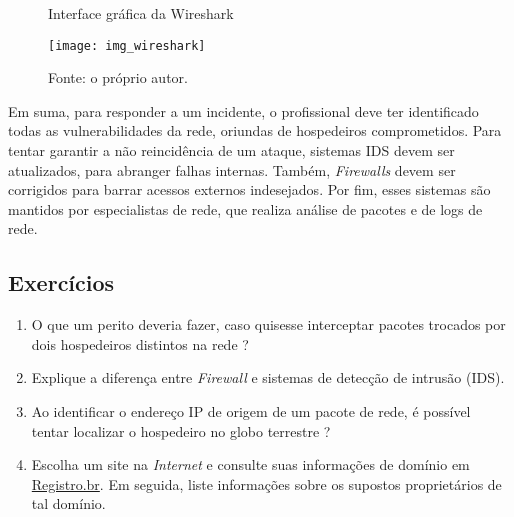     \begin{figure}[H]
    	\centering
    	\caption{Interface gráfica da Wireshark}
    	\texttt{[image: img\_wireshark]}
    	\caption*{Fonte: o próprio autor.}
    	\label{wireshark_ex}
    \end{figure}

    \hspace{1cm}
    Em suma, para responder a um incidente, o profissional deve ter identificado todas as vulnerabilidades da rede, oriundas de hospedeiros comprometidos. Para tentar garantir a não reincidência de um ataque, sistemas IDS devem ser atualizados, para abranger falhas internas. Também, \textit{Firewalls} devem ser corrigidos para barrar acessos externos indesejados. Por fim, esses sistemas são mantidos por especialistas de rede, que realiza análise de pacotes e de logs de rede.

    \subsection{Exercícios}
    
    \begin{example} \label{cap4_exercicios}
        \begin{enumerate}
            \item O que um perito deveria fazer, caso quisesse interceptar pacotes trocados por dois hospedeiros distintos na rede ?
            \item Explique a diferença entre \textit{Firewall} e sistemas de detecção de intrusão (IDS).
            \item Ao identificar o endereço IP de origem de um pacote de rede, é possível tentar localizar o hospedeiro no globo terrestre ? 
            \item Escolha um site na \textit{Internet} e consulte suas informações de domínio em \href{https://registro.br/tecnologia/ferramentas/whois/}{Registro.br}. Em seguida, 
            liste informações sobre os supostos proprietários de tal domínio.
        \end{enumerate}
    \end{example}

\newpage